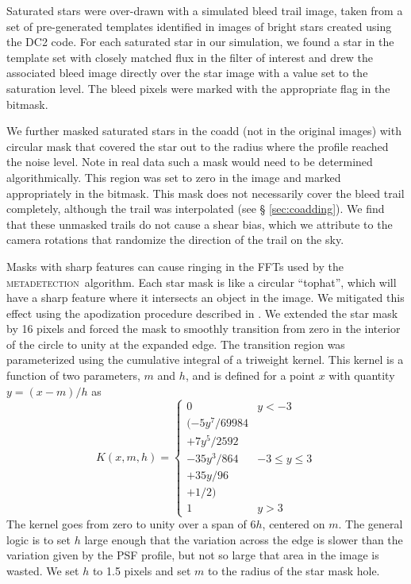 \documentclass[twocolumn,twocolappendix,astrosym]{openjournal}
\newcommand{\mdet}{\textsc{metadetection}}
\begin{document}
Saturated stars were over-drawn with a simulated bleed trail image, taken from
a set of pre-generated templates identified in images of bright stars created
using the DC2 code.  For each saturated star in our simulation, we found a star
in the template set with closely matched flux in the filter of interest and
drew the associated bleed image directly over the star image with a value set
to the saturation level.  The bleed pixels were marked with the appropriate
flag in the bitmask.

We further masked saturated stars in the coadd (not in the original images)
with circular mask that covered the star out to the radius where the profile
reached the noise level.  Note in real data such a mask would need to be
determined algorithmically.   This region was set to zero in the image and
marked appropriately in the bitmask.   This mask does not necessarily cover the
bleed trail completely, although the trail was interpolated (see \S
\ref{sec:coadding}).  We find that these unmasked trails do not cause a shear
bias, which we attribute to the camera rotations that randomize the direction
of the trail on the sky.

Masks with sharp features can cause ringing in the FFTs used by the \mdet\
algorithm.   Each star mask is like a circular ``tophat'', which will have a
sharp feature where it intersects an object in the image.  We mitigated this
effect using the apodization procedure described in \citet{BeckerMdetCoadd}. We
extended the star mask by 16 pixels and forced the mask to smoothly transition
from zero in the interior of the circle to unity at the expanded edge. The
transition region was parameterized using the cumulative integral of a
triweight kernel. This kernel is a function of two parameters, $m$ and $h$, and
is defined for a point $x$ with quantity $y = (x-m)/h$ as
\begin{equation}
K(x, m, h) = \begin{cases}
0 & y < -3 \\
(-5y^7 / 69984 \\
+ 7y^5 / 2592 \\
- 35y^3 / 864 & -3 \le y \le 3 \\
+ 35y / 96 \\
+ 1 / 2) \\
1 & y > 3
\end{cases}
\end{equation}
The kernel goes from zero to unity over a span of $6h$, centered on $m$.
The general logic is to set $h$ large enough that the variation across the edge is slower
than the variation given by the PSF profile, but not so large that area in the image is
wasted. We set $h$ to 1.5 pixels and set $m$ to the radius of the star mask hole.
\end{document}
